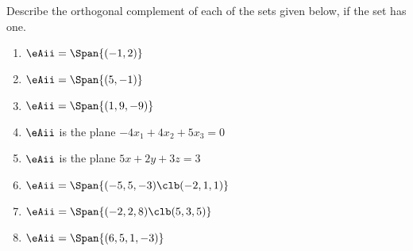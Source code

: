 \begin{exercise} \label{ex:} 
Describe the orthogonal complement of each of the sets given below, if the set has one.
\begin{enumerate}
\item \(\mathbb{\eAii}=\Span\{(-1,2)\}\)

\item \(\mathbb{\eAii}=\Span\{(5,-1)\}\)

\item \(\mathbb{\eAii}=\Span\{(1,9,-9)\}\)

\item \(\mathbb{\eAii}\) is the plane \(-4x_1+4x_2+5x_3=0\)

\item \(\mathbb{\eAii}\) is the plane \(5x+2y+3z=3\)

\item \(\mathbb{\eAii}=\Span\{(-5,5,-3)\clb (-2,1,1)\}\)

\item \(\mathbb{\eAii}=\Span\{(-2,2,8)\clb (5,3,5)\}\)

\item \(\mathbb{\eAii}=\Span\{(6,5,1,-3)\}\)


\end{enumerate}
\end{exercise}





